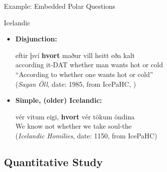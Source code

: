 \documentclass[hyperref={pdfpagelabels=false}]{beamer}
\begin{document}
\begin{frame}{Example: Embedded Polar Questions}
	\begin{block}{Icelandic}
		\begin{itemize}
		\item[ ]\textbf{Disjunction:}
		\begin{exe}
			\ex \gll eftir því \textbf{hvort} maður vill heitt eða kalt\\
			according it-DAT whether man wants hot or cold\\
			\quad ``According to whether one wants hot or cold'' \\(\textsl{Sagan Öll}, date: 1985, from IcePaHC, \citealt{icepahc09})
		\end{exe}
		\item[ ]\textbf{Simple, (older) Icelandic:}
		\begin{exe}
			\ex \gll vér vitum eigi, \textbf{hvort} vér tökum öndina\\
			We know not whether we take soul-the\\
			(\textsl{Icelandic Homilies}, date: 1150, from IcePaHC)
		\end{exe}
		\end{itemize}		
	\end{block}

\end{frame}





\subsection{Quantitative Study}

\end{document}
